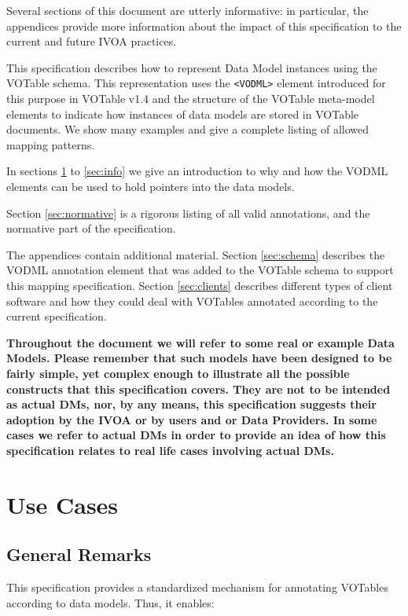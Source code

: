 \documentclass[11pt,a4paper]{ivoa}
\begin{document}
Several sections of this document are utterly informative: in
particular, the appendices provide more information about the impact of
this specification to the current and future IVOA practices.

This specification describes how to represent Data Model instances using
the VOTable schema. This representation uses the
\texttt{\textless{}VODML\textgreater{}} element introduced for this
purpose in VOTable v1.4 \cite{2019ivoa.spec.1021O} and the structure of the VOTable
meta-model elements to indicate how instances of data models are stored
in VOTable documents. We show many examples and give a complete listing
of allowed mapping patterns.

In sections \ref{sec:usecases} to \ref{sec:info} we give an
introduction to why and how the VODML elements can be used to hold
pointers into the data models.

Section \ref{sec:normative} is a rigorous listing of all valid
annotations, and the normative part of the specification.

The appendices contain additional material. Section \ref{sec:schema}
describes the VODML annotation element that was added to the VOTable
schema to support this mapping specification. Section \ref{sec:clients}
describes different types of client software and how they could deal
with VOTables annotated according to the current specification.

\textbf{Throughout the document we will refer to some real or example
Data Models. Please remember that such models have been designed to be
fairly simple, yet complex enough to illustrate all the possible
constructs that this specification covers. They are not to be intended
as actual DMs, nor, by any means, this specification suggests their
adoption by the IVOA or by users and or Data Providers. In some cases we
refer to actual DMs in order to provide an idea of how this
specification relates to real life cases involving actual DMs.}

\section{Use Cases}\label{sec:usecases}

\subsection{General Remarks}\label{general-remarks}

This specification provides a standardized mechanism for annotating
VOTables according to data models. Thus, it enables:
\end{document}
